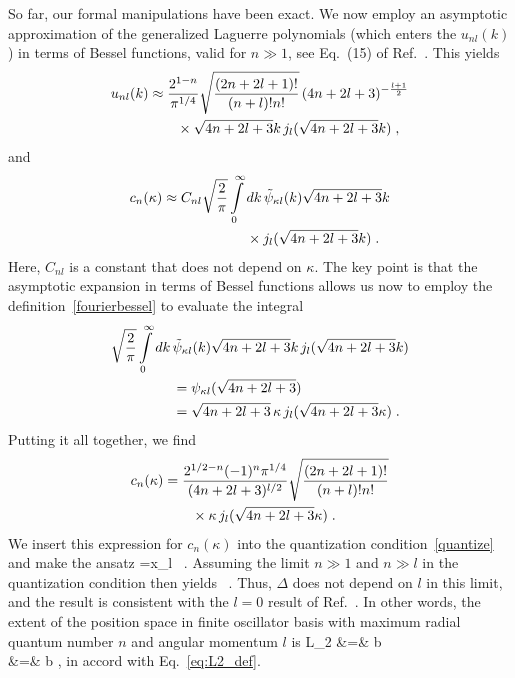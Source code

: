 	So far, our formal manipulations have been exact.  We now employ an
	asymptotic approximation of the generalized Laguerre polynomials
	(which enters the $u_{nl}(k)$) in terms of Bessel functions, valid for
	$n\gg 1$, see Eq.~(15) of Ref.~\cite{Deano2013}.  This yields
	\begin{align}
	u_{nl}(k) &\approx {2^{1-n}\over \pi^{1/4}} \sqrt{(2n+2l+1)!\over (n+l)! n!}
	   \,(4n+2l+3)^{-{l+1\over 2}}
	  \nonumber \\
	  & \qquad \null\times \sqrt{4n+2l+3} k\, j_l(\sqrt{4n+2l+3}k) \;,
	\end{align}
	and
	\begin{align}
	c_n(\kappa) &\approx C_{nl} \sqrt{2\over \pi}\int\limits_0^\infty dk \,
	\tilde{\psi}_{\kappa l}(k)	\sqrt{4n+2l+3} k \nonumber \\
	  & \qquad\qquad\qquad \null \times j_l(\sqrt{4n+2l+3}k) \;.
	\end{align}
	Here, $C_{nl}$ is a constant that does not depend on $\kappa$.  The key
	point is that the asymptotic expansion in terms of Bessel functions
	allows us now to employ the definition~\eqref{fourierbessel} to
	evaluate the integral
	\begin{align}
	 \sqrt{2\over \pi}\int\limits_0^\infty dk\, & \tilde{\psi}_{\kappa l}(k)
	\sqrt{4n+2l+3} k\, j_l(\sqrt{4n+2l+3}k) \nonumber \\
	&=  \psi_{\kappa l}(\sqrt{4n+2l+3}) \nonumber \\
	&= \sqrt{4n+2l+3}\, \kappa\, j_l(\sqrt{4n+2l+3}\kappa) \;.
	\end{align}
	Putting it all together, we find
	\begin{align}
	c_n(\kappa) &= {2^{1/2-n}(-1)^n \pi^{1/4} \over (4n+2l+3)^{l/2}}
	\sqrt{(2n+2l+1)!\over (n+l)!n!} \nonumber \\
	 & \qquad\null\times
	\kappa\, j_l(\sqrt{4n+2l+3}\kappa) \;.
	\end{align}
	We insert this expression for $c_n(\kappa)$ into the quantization
	condition~\eqref{quantize} and make the ansatz
	\beq
	\kappa ={x_l\over{}} \ .
	\eeq
	Assuming the limit $n\gg 1$ and $n\gg l$ in the quantization condition
	then yields
	\beq
	 \ .
	\eeq
	Thus, $\Delta$ does not depend on $l$ in this limit, and the result
	is consistent with the $l=0$ result of Ref.~\cite{More:2013rma}. In
	other words, the extent of the position space in finite oscillator
	basis with maximum radial quantum number $n$ and angular momentum $l$ is
	\bea
	\label{L2}
	  L_2 &=& b \nonumber\\
	&=& b \;,
	\eea
	in accord with Eq.~\eqref{eq:L2_def}.

